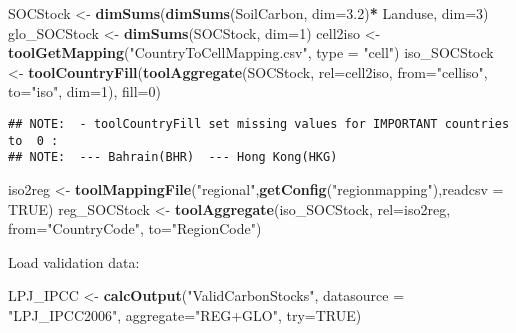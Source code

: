 \documentclass[
]{article}
\newenvironment{Shaded}{\begin{snugshade}}{\end{snugshade}}
\newcommand{\DataTypeTok}[1]{\textcolor[rgb]{0.13,0.29,0.53}{#1}}
\newcommand{\DecValTok}[1]{\textcolor[rgb]{0.00,0.00,0.81}{#1}}
\newcommand{\FloatTok}[1]{\textcolor[rgb]{0.00,0.00,0.81}{#1}}
\newcommand{\KeywordTok}[1]{\textcolor[rgb]{0.13,0.29,0.53}{\textbf{#1}}}
\newcommand{\NormalTok}[1]{#1}
\newcommand{\OperatorTok}[1]{\textcolor[rgb]{0.81,0.36,0.00}{\textbf{#1}}}
\newcommand{\OtherTok}[1]{\textcolor[rgb]{0.56,0.35,0.01}{#1}}
\newcommand{\StringTok}[1]{\textcolor[rgb]{0.31,0.60,0.02}{#1}}
\begin{document}
\begin{Shaded}
\begin{Highlighting}[]
\NormalTok{SOCStock     <{-}}\StringTok{ }\KeywordTok{dimSums}\NormalTok{(}\KeywordTok{dimSums}\NormalTok{(SoilCarbon, }\DataTypeTok{dim=}\FloatTok{3.2}\NormalTok{)}\OperatorTok{*}\StringTok{ }\NormalTok{Landuse, }\DataTypeTok{dim=}\DecValTok{3}\NormalTok{)}
\NormalTok{glo\_SOCStock <{-}}\StringTok{ }\KeywordTok{dimSums}\NormalTok{(SOCStock, }\DataTypeTok{dim=}\DecValTok{1}\NormalTok{) }
\NormalTok{cell2iso     <{-}}\StringTok{ }\KeywordTok{toolGetMapping}\NormalTok{(}\StringTok{"CountryToCellMapping.csv"}\NormalTok{, }\DataTypeTok{type =} \StringTok{"cell"}\NormalTok{)}
\NormalTok{iso\_SOCStock <{-}}\StringTok{ }\KeywordTok{toolCountryFill}\NormalTok{(}\KeywordTok{toolAggregate}\NormalTok{(SOCStock, }\DataTypeTok{rel=}\NormalTok{cell2iso, }\DataTypeTok{from=}\StringTok{"celliso"}\NormalTok{, }\DataTypeTok{to=}\StringTok{"iso"}\NormalTok{, }\DataTypeTok{dim=}\DecValTok{1}\NormalTok{), }\DataTypeTok{fill=}\DecValTok{0}\NormalTok{)}
\end{Highlighting}
\end{Shaded}

\begin{verbatim}
## NOTE:  - toolCountryFill set missing values for IMPORTANT countries to  0 :
## NOTE:  --- Bahrain(BHR)  --- Hong Kong(HKG)
\end{verbatim}

\begin{Shaded}
\begin{Highlighting}[]
\NormalTok{iso2reg      <{-}}\StringTok{ }\KeywordTok{toolMappingFile}\NormalTok{(}\StringTok{"regional"}\NormalTok{,}\KeywordTok{getConfig}\NormalTok{(}\StringTok{"regionmapping"}\NormalTok{),}\DataTypeTok{readcsv =} \OtherTok{TRUE}\NormalTok{)}
\NormalTok{reg\_SOCStock <{-}}\StringTok{ }\KeywordTok{toolAggregate}\NormalTok{(iso\_SOCStock, }\DataTypeTok{rel=}\NormalTok{iso2reg, }\DataTypeTok{from=}\StringTok{"CountryCode"}\NormalTok{, }\DataTypeTok{to=}\StringTok{"RegionCode"}\NormalTok{)}
\end{Highlighting}
\end{Shaded}

Load validation data:

\begin{Shaded}
\begin{Highlighting}[]
\NormalTok{  LPJ\_IPCC   <{-}}\StringTok{ }\KeywordTok{calcOutput}\NormalTok{(}\StringTok{"ValidCarbonStocks"}\NormalTok{, }\DataTypeTok{datasource =} \StringTok{"LPJ\_IPCC2006"}\NormalTok{, }\DataTypeTok{aggregate=}\StringTok{"REG+GLO"}\NormalTok{, }\DataTypeTok{try=}\OtherTok{TRUE}\NormalTok{)}
\end{Highlighting}
\end{Shaded}
\end{document}
